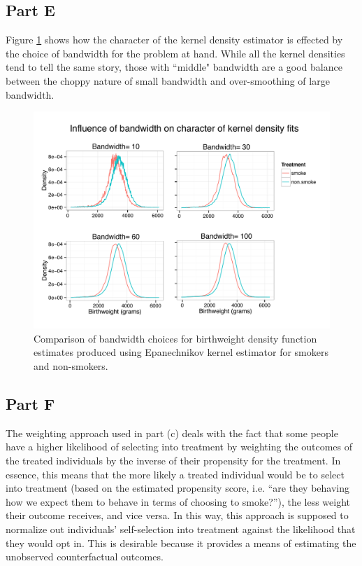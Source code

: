 \documentclass[letterpaper, 12pt]{article}
\begin{document}



\subsection{Part E}

Figure \ref{fig:kernelbw} shows how the character of the kernel density estimator is effected by the choice of bandwidth for the problem at hand.  While all the kernel densities tend to tell the same story, those with ``middle" bandwidth are a good balance between the choppy nature of small bandwidth and over-smoothing of large bandwidth.

\begin{figure}[h!]
   \centering
   \includegraphics[width=6in]{img/kdens-combinebw.pdf} 
   \caption{Comparison of bandwidth choices for birthweight density function estimates produced using Epanechnikov kernel estimator for smokers and non-smokers.}
   \label{fig:kernelbw}
\end{figure}

\subsection{Part F}
The weighting approach used in part (c) deals with the fact that some people have a higher likelihood of selecting into treatment by weighting the outcomes of the treated individuals by the inverse of their propensity for the treatment. In essence, this means that the more likely a treated individual would be to select into treatment (based on the estimated propensity score, i.e. ``are they behaving how we expect them to behave in terms of choosing to smoke?''), the less weight their outcome receives, and vice versa. In this way, this approach is supposed to normalize out individuals' self-selection into treatment against the likelihood that they would opt in. This is desirable because it provides a means of estimating the unobserved counterfactual outcomes. 
\end{document}

